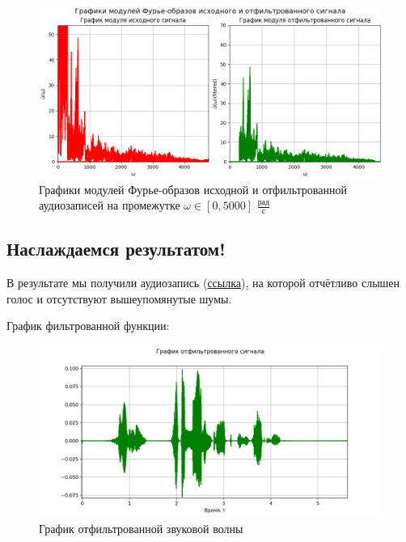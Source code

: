\begin{figure}[ht!]
    \centering
    \includegraphics[width=\textwidth]{media/2 task/detailed_comparison.png}
    \caption{Графики модулей Фурье-образов исходной и отфильтрованной аудиозаписей на промежутке $\omega \in [0, 5000]$ $\frac{\text{рад}}{\text{с}}$}
    \label{fig:fourc_orig_detailed_wave}
\end{figure}

\clearpage
\subsection{Наслаждаемся результатом!}

В результате мы получили аудиозапись (\href{https://disk.yandex.ru/d/NHTrsfW_m_KmMQ}{ссылка}), на которой отчётливо слышен голос и отсутствуют вышеупомянутые шумы.

График фильтрованной функции:

\begin{figure}[ht!]
    \centering
    \includegraphics[scale=0.6]{media/2 task/Cleaned_Звуковая волна.png}
    \caption{График отфильтрованной звуковой волны}
    \label{fig:filtered_wave}
\end{figure}

